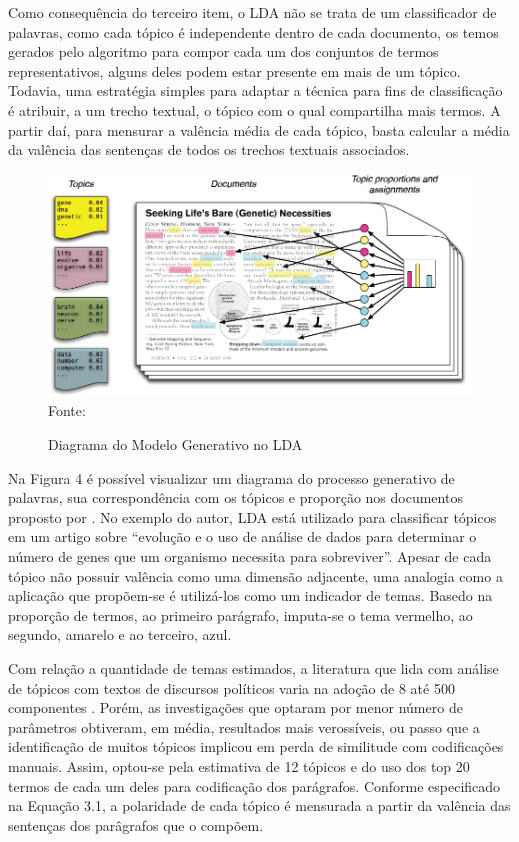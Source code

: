\documentclass[
12pt,				%
openright,			%
twoside,			%
a4paper,			%
english,			%
french,				%
spanish,			%
brazil				%
]{abntex2}
\begin{document}
Como consequência do terceiro item, o LDA não se trata de um classificador de palavras, como cada tópico é independente dentro de cada documento, os temos gerados pelo algoritmo para compor cada um dos conjuntos de termos representativos, alguns deles podem estar presente em mais de um tópico. Todavia, uma estratégia simples para adaptar a técnica para fins de classificação é atribuir, a um trecho textual, o tópico com o qual compartilha mais termos. A partir daí, para mensurar a valência média de cada tópico, basta calcular a média da valência das sentenças de todos os trechos textuais associados.

\begin{figure}[h]
	\caption{Diagrama do Modelo Generativo no LDA}
	\label{fig:lda}
	\centering
	\includegraphics[width=1\linewidth]{figures/diagrama_lda}
	Fonte: 
\end{figure}

Na Figura 4 é possível visualizar um diagrama do processo generativo de palavras, sua correspondência com os tópicos e proporção nos documentos proposto por . No exemplo do autor, LDA está utilizado para classificar tópicos em um artigo sobre ``evolução e o uso de análise de dados para determinar o número de genes que um organismo necessita para sobreviver''. Apesar de cada tópico não possuir valência como uma dimensão adjacente, uma analogia como a aplicação que propõem-se é utilizá-los como um indicador de temas. Basedo na proporção de termos, ao primeiro parágrafo, imputa-se o tema vermelho, ao segundo, amarelo e ao terceiro, azul. 

Com relação a quantidade de temas estimados, a literatura que lida com análise de tópicos com textos de discursos políticos varia na adoção de 8 até 500 componentes \cite{chen2010opinion, fang2012mining, balasubramanyan2012modeling, balasubramanyan2012modeling, cohen2013classifying, song2014analyzing, levy2014driving, van2014lda,zirn2014multidimensional}. Porém, as investigações que optaram por menor número de parâmetros obtiveram, em média, resultados mais verossíveis, ou passo que a identificação de muitos tópicos implicou em perda de similitude com codificações manuais. Assim, optou-se pela estimativa de 12 tópicos e do uso dos top 20 termos de cada um deles para codificação dos parágrafos. Conforme especificado na Equação 3.1, a polaridade de cada tópico é mensurada a partir da valência das sentenças dos parâgrafos que o compõem.  
 
\end{document}
